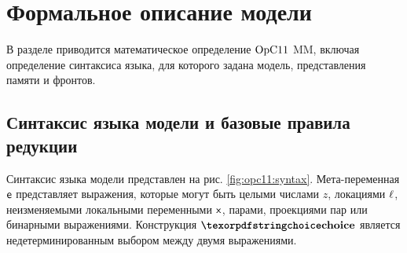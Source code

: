 

\section{Формальное описание модели}
\label{sec:opc11:formal}
В разделе приводится математическое определение $\mathrm{OpC11}$ MM,
включая определение синтаксиса языка, для которого задана модель,
представления памяти и фронтов.

\subsection{Синтаксис языка модели и базовые правила редукции}
\label{sec:opc11:formal:baselang}
Синтаксис языка модели представлен на рис. \ref{fig:opc11:syntax}.
Мета-переменная $\mathsf{e}$ представляет выражения, которые могут быть
целыми числами $z$, локациями $\ell$, неизменяемыми локальными
переменными $\mathsf{x}$, парами, проекциями пар или бинарными выражениями.
Конструкция $\kw{choice}$ является недетерминированным выбором между двумя
выражениями.

